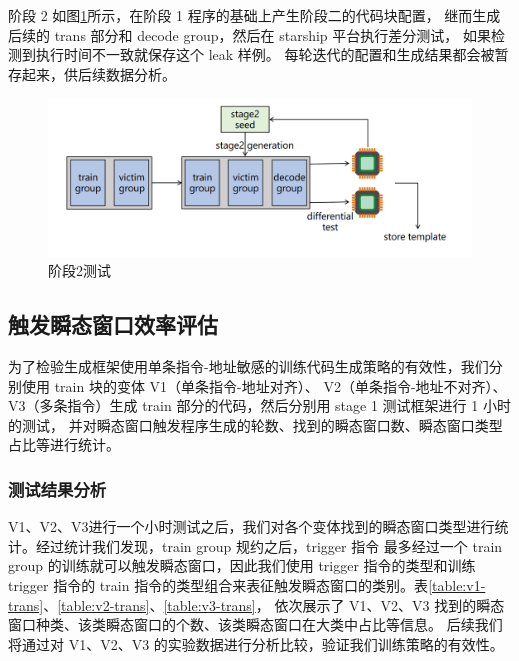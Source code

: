 阶段 2 如图\ref{paper:stage2-test}所示，在阶段 1 程序的基础上产生阶段二的代码块配置，
继而生成后续的 trans 部分和 decode group，然后在 starship 平台执行差分测试，
如果检测到执行时间不一致就保存这个 leak 样例。
每轮迭代的配置和生成结果都会被暂存起来，供后续数据分析。\par

\begin{figure}[!h]
    \centering
    \includegraphics[width=\linewidth]{figure/paper/stage2-test.png}
    \caption{阶段2测试}
    \label{paper:stage2-test}
\end{figure}

\subsection{触发瞬态窗口效率评估}

为了检验生成框架使用单条指令-地址敏感的训练代码生成策略的有效性，我们分别使用 train 块的变体 V1（单条指令-地址对齐）、
V2（单条指令-地址不对齐）、V3（多条指令）生成 train 部分的代码，然后分别用 stage 1 测试框架进行 1 小时的测试，
并对瞬态窗口触发程序生成的轮数、找到的瞬态窗口数、瞬态窗口类型占比等进行统计。\par

\subsubsection{测试结果分析}

V1、V2、V3进行一个小时测试之后，我们对各个变体找到的瞬态窗口类型进行统计。经过统计我们发现，train group 规约之后，trigger 指令
最多经过一个 train group 的训练就可以触发瞬态窗口，因此我们使用 trigger 指令的类型和训练 trigger 指令的
train 指令的类型组合来表征触发瞬态窗口的类别。表\ref{table:v1-trans}、\ref{table:v2-trans}、\ref{table:v3-trans}，
依次展示了 V1、V2、V3 找到的瞬态窗口种类、该类瞬态窗口的个数、该类瞬态窗口在大类中占比等信息。
后续我们将通过对 V1、V2、V3 的实验数据进行分析比较，验证我们训练策略的有效性。\par

